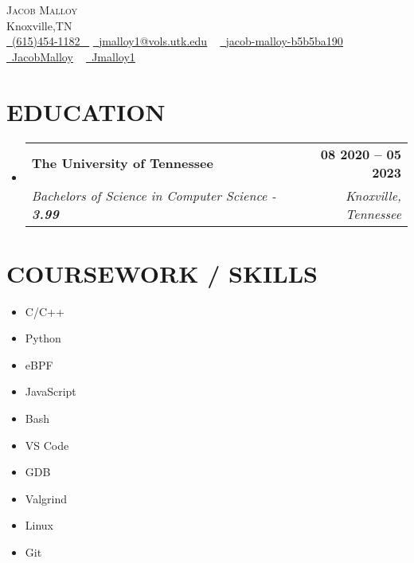 \documentclass[letterpaper,12pt]{article}
\makeatletter
\newcommand{\resumeSubheading}[4]{
    \vspace{-2pt}\item
        \begin{tabular*}{1.0\textwidth}[t]{l@{\extracolsep{\fill}}r}
            \textbf{\large#1} & \textbf{\small #2} \\
            \textit{\large#3} & \textit{\small #4} \\

        \end{tabular*}\vspace{-7pt}
}
\newcommand{\resumeSubHeadingListStart}{\begin{itemize}[leftmargin=0.0in, label={}]}
\newcommand{\resumeSubHeadingListEnd}{\end{itemize}}
\makeatother
\begin{document}

\begin{center}
        {\Huge \scshape Jacob Malloy} \\ \vspace{1pt}
        Knoxville,TN \\ \vspace{1pt}
        \small \href{tel:+16154541182}{ \raisebox{-0.1\height}\faPhone\ \underline{(615)454-1182} ~} \href{mailto:jmalloy1@vols.utk.edu}{\raisebox{-0.2\height}\faEnvelope\  \underline{jmalloy1@vols.utk.edu}} ~
        \href{https://www.linkedin.com/in/jacob-malloy-b5b5ba190/}{\raisebox{-0.2\height}\faLinkedinSquare\ \underline{jacob-malloy-b5b5ba190}}  ~
        \href{https://github.com/jacobmalloy}{\raisebox{-0.2\height}\faGithub\ \underline{JacobMalloy}} ~
        \href{https://gitlab.com/jmalloy1}{\raisebox{-0.2\height}\faGitlab\ \underline{Jmalloy1}} ~
        \vspace{-8pt}
\end{center}


\section{EDUCATION}
    \resumeSubHeadingListStart
        \resumeSubheading
            {The University of Tennessee}{08 2020 -- 05 2023}
            {Bachelors of Science in Computer Science - \textbf{3.99}}{Knoxville, Tennessee}
    \resumeSubHeadingListEnd

\section{COURSEWORK / SKILLS}
                \begin{multicols}{5}
                        \begin{itemize}[itemsep=-2pt, parsep=4pt]
                                \item C/C++
                                \item Python
                                \item eBPF
                                \item JavaScript
                                \item Bash
                                \item VS Code
                                \item GDB
                                \item Valgrind
                                \item Linux
                                \item Git
                        \end{itemize}
                \end{multicols}
                \vspace*{2.0\multicolsep}
\end{document}
